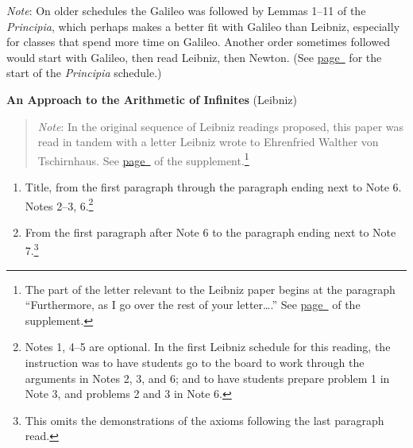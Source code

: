 \documentclass[10pt]{article}
\begin{document}
{\small \emph{Note}: On older schedules the Galileo was followed by Lemmas 1--11 of the \emph{Principia}, which perhaps makes a better fit with Galileo than Leibniz, especially for classes that spend more time on Galileo. Another order sometimes followed would start with Galileo, then read Leibniz, then Newton. (See \hyperref[NewtonStart]{page~\pageref{NewtonStart}} for the start of the \emph{Principia} schedule.)

\textbf{An Approach to the Arithmetic of Infinites} (Leibniz)
\label{LeibnizInfinites}
\begin{quote}
	\small{\emph{Note}: In the original sequence of Leibniz readings proposed, this paper was read in tandem with a letter Leibniz wrote to Ehrenfried Walther von Tschirnhaus. See
	\hyperref[supple.86]{page~\pageref{supple.86}} of the
	supplement.}\footnote{The part of the letter relevant to the Leibniz paper begins at the paragraph ``Furthermore, as I go over the rest of your letter\ldots.'' See \hyperref[supple.92]{page~\pageref{supple.92}} of the supplement.}
\end{quote}
\begin{enumerate}[resume*]
	\item Title, from the first paragraph through the paragraph ending next
		to Note 6. Notes 2--3, 6.\footnote{Notes 1, 4--5 are optional. In the first Leibniz schedule for this reading, the instruction was to have students go to the board to work through the arguments in Notes 2, 3, and 6; and to have students prepare problem 1 in Note 3, and problems 2 and 3 in Note 6.}
	\item From the first paragraph after
		Note 6 to the paragraph ending next to
		Note 7.\footnote{This omits the
			demonstrations of the axioms following the last paragraph read.}
\end{enumerate}

}
\end{document}
